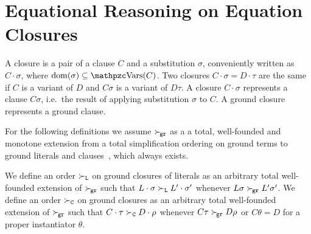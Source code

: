 

\section{Equational Reasoning on Equation Closures}\label{sec:reasoning:on:equational:closures}

\begin{definition}
    A closure is a pair of a clause \( C \) and a substitution \( \sigma \),
    conveniently written as \( C\cdot\sigma \), where \( \domain(\sigma) \subseteq \var(C)\). 
    Two closures \( C\cdot\sigma = D\cdot\tau \)
    are the same if \( C \) is a variant of \( D \) and \( C\sigma \) is a variant of \( D\tau \).
    A closure \( C\cdot\sigma \) represents a clause \( C\sigma \),
    i.e.~the result of applying substitution \( \sigma \) to \( C \).
    A ground closure represents a ground clause.
\end{definition}

For the following definitions we assume
\( \mathrel\succ_{\!\mathtt{gr}} \) as a a total, well-founded and monotone extension
from a total simplification ordering on ground terms
to ground literals and clauses~\cite{NR2001},
which always exists.


\begin{definition}
    We define an order \( \mathrel\succ_{\mathtt{L}} \) on ground closures of literals
    as an arbitrary total well-founded extension of \( \mathrel\succ_{\!\mathtt{gr}} \)
    such that
    \( L\cdot\sigma\mathrel\succ_{\mathtt{L}} L'\cdot\sigma' \) whenever
    \( L\sigma\mathrel\succ_{\!\mathtt{gr}} L'\sigma' \).
% 
    We define an order \( \mathrel\succ_{\mathtt{C}} \) on ground closures
    as an arbitrary total well-founded extension of
    \( \mathrel\succ_{\!\mathtt{gr}} \)
    such that
    \( C\cdot\tau\mathrel\succ_{\mathtt{C}} D\cdot\rho \) whenever
    \( C\tau\mathrel\succ_{\!\mathtt{gr}} D\rho \) or \( C\theta = D \) for a proper instantiator \( \theta \).
\end{definition}

